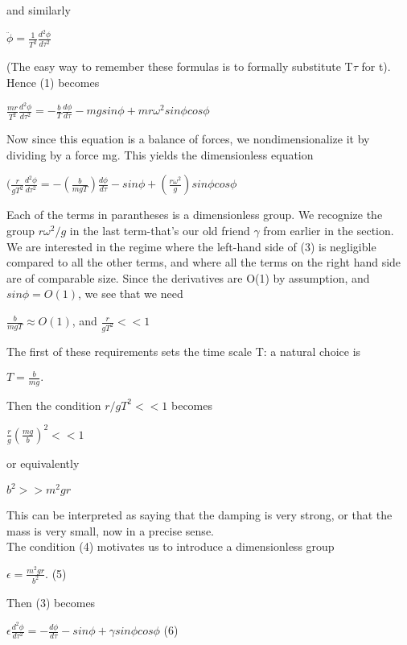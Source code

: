 \documentclass{article}
\newcommand\tab[1][1cm]{\hspace*{#1}}
\begin{document}
and similarly 
\begin{center}
$\ddot{\phi}=\frac{1}{T^2} \frac{d^{2}\phi}{d{\tau^{2}}}$
\end{center}
(The easy way to remember these formulas is to formally substitute T$\tau$ for t). Hence (1) becomes
\begin{center}
$\frac{mr}{T^{2}}\frac{d^{2}\phi}{d{\tau^{2}}} = -\frac{b}{T}\frac{d\phi}{d\tau}-mg sin \phi + mr \omega^{2}sin\phi cos \phi$
\end{center}
Now since this equation is a balance of forces, we nondimensionalize it by dividing by a force mg. This yields the dimensionless equation
\begin{center}
$(\frac{r}{gT^{2}}\frac{d^{2}\phi}{d\tau^{2}}= - (\frac{b}{mgT}) \frac{d \phi}{d \tau} - sin \phi + (\frac{r\omega^{2}}{g}) sin \phi cos \phi$
\end{center}
Each of the terms in parantheses is a dimensionless group. We recognize the group $r \omega^{2}/g$ in the last term-that's our old friend $\gamma$ from earlier in the section. \\
\tab We are interested in the regime where the left-hand side of (3) is negligible compared to all the other terms, and where all the terms on the right hand side are of comparable size. Since the derivatives are O(1) by assumption, and $sin \phi = O(1)$, we see that we need
\begin{center}
$\frac{b}{mgT} \approx O(1)$, and $\frac{r}{gT^{2}} << 1$
\end{center} 
The first of these requirements sets the time scale T: a natural choice is 
\begin{center}
$T = \frac{b}{mg}.$
\end{center}
Then the condition $r/gT^{2} <<1$ becomes
\begin{center}
$\frac{r}{g}(\frac{mg}{b})^{2} << 1$
\end{center}
or equivalently
\begin{center}
$b^{2} >> m^{2}gr$
\end{center}
This can be interpreted as saying that the damping is very strong, or that the mass is very small, now in a precise sense. \\
\tab The condition (4) motivates us to introduce a dimensionless group
\begin{center}
$\epsilon = \frac{m^{2}gr}{b^{2}}.$ \tab (5)
\end{center}
Then (3) becomes 
\begin{center}
$\epsilon \frac{d^{2}\phi}{d\tau^{2}}=-\frac{d\phi}{d\tau}-sin \phi + \gamma sin \phi cos \phi$ \tab (6)
\end{center}
\end{document}
